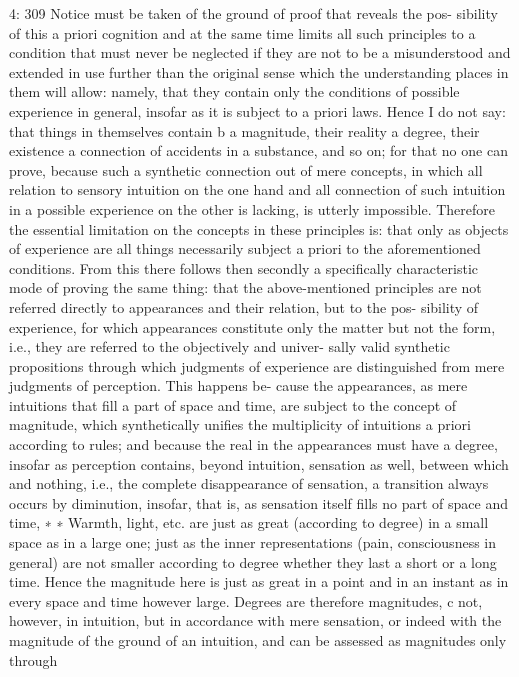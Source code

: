 4: 309
Notice must be taken of the ground of proof that reveals the pos-
sibility of this a priori cognition and at the same time limits all such
principles to a condition that must never be neglected if they are not to
be a misunderstood and extended in use further than the original sense
which the understanding places in them will allow: namely, that they
contain only the conditions of possible experience in general, insofar as
it is subject to a priori laws. Hence I do not say: that things in themselves
contain b a magnitude, their reality a degree, their existence a connection
of accidents in a substance, and so on; for that no one can prove, because
such a synthetic connection out of mere concepts, in which all relation
to sensory intuition on the one hand and all connection of such intuition
in a possible experience on the other is lacking, is utterly impossible.
Therefore the essential limitation on the concepts in these principles is:
that only as objects of experience are all things necessarily subject a priori
to the aforementioned conditions.
From this there follows then secondly a speciﬁcally characteristic
mode of proving the same thing: that the above-mentioned principles
are not referred directly to appearances and their relation, but to the pos-
sibility of experience, for which appearances constitute only the matter
but not the form, i.e., they are referred to the objectively and univer-
sally valid synthetic propositions through which judgments of experience
are distinguished from mere judgments of perception. This happens be-
cause the appearances, as mere intuitions that ﬁll a part of space and time,
are subject to the concept of magnitude, which synthetically uniﬁes the
multiplicity of intuitions a priori according to rules; and because the real
in the appearances must have a degree, insofar as perception contains,
beyond intuition, sensation as well, between which and nothing, i.e.,
the complete disappearance of sensation, a transition always occurs by
diminution, insofar, that is, as sensation itself ﬁlls no part of space and time, ∗
∗ Warmth, light, etc. are just as great (according to degree) in a small space as in a
large one; just as the inner representations (pain, consciousness in general) are
not smaller according to degree whether they last a short or a long time. Hence
the magnitude here is just as great in a point and in an instant as in every space
and time however large. Degrees are therefore magnitudes, c not, however, in
intuition, but in accordance with mere sensation, or indeed with the magnitude
of the ground of an intuition, and can be assessed as magnitudes only through
